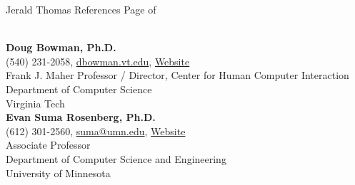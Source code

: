



\newpage

\setcounter{page}{1}
\makecvfooter
  {Jerald Thomas}
  {References}
  {Page \thepage \hspace{1pt} of \pageref{references_last}}


\makecvheader[C]
\singlespacing

\\

\textbf{Doug Bowman, Ph.D.}\\
\hspace*{0.25cm}\faPhone\hspace*{0.1cm}(540) 231-2058,\hspace*{0.2cm} \faEnvelopeO\hspace*{0.1cm}\href{mailto://dbowman@vt.edu}{dbowman.vt.edu}, \faLink\hspace*{0.1cm}\href{https://people.cs.vt.edu/~bowman/}{Website}\\
\hspace*{0.25cm} Frank J. Maher Professor / Director, Center for Human Computer Interaction\\
\hspace*{0.25cm} Department of Computer Science\\
\hspace*{0.25cm} Virginia Tech\\

\textbf{Evan Suma Rosenberg, Ph.D.}\\
\hspace*{0.25cm}\faPhone\hspace*{0.1cm}(612) 301-2560,\hspace*{0.2cm} \faEnvelopeO\hspace*{0.1cm}\href{mailto://suma@umn.edu}{suma@umn.edu}, \faLink\hspace*{0.1cm}\href{https://illusioneering.umn.edu}{Website}\\
\hspace*{0.25cm} Associate Professor\\
\hspace*{0.25cm} Department of Computer Science and Engineering\\
\hspace*{0.25cm} University of Minnesota\\

